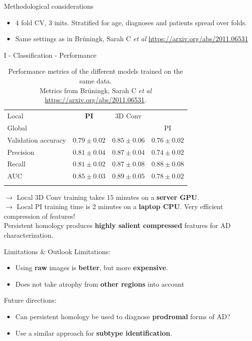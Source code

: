 \documentclass[aspectratio=169, 10pt, dvipsnames]{beamer}
\begin{document}
\begin{frame}[fragile]{Methodological considerations}
  \begin{itemize}
  \item 4 fold CV, 3 inits. Stratified for age, diagnoses and patients spread over folds.
  \item Same settings as in Br{\"u}ningk, Sarah C \textit{et al} \url{https://arxiv.org/abs/2011.06531}
  \end{itemize}
\end{frame}

\begin{frame}[fragile]{I - Classification - Performance}
\begin{table}
  \centering
  \begin{tabular}{lccc}
    \toprule
    Local & \textbf{PI} & 3D Conv & \\
    Global &&& PI\\
    \midrule
    Validation accuracy & $0.79\pm 0.02$ & $0.85\pm 0.06$ & $ 0.76\pm 0.02$ \\
    Precision & $0.81\pm 0.04$  & $0.87\pm0.04$ &  $0.74\pm 0.02$ \\
    Recall & $0.81\pm 0.02$ & $0.87\pm0.08$ & $0.88\pm 0.08$\\
    AUC & $0.85\pm 0.03$ & $0.89\pm0.05$ &  $ 0.78\pm 0.02$\\
    \bottomrule
    \vspace{1pt}
  \end{tabular}
  \caption{Performance metrics of the different models trained on the same data. \\Metrics from Br{\"u}ningk, Sarah C \textit{et al} \url{https://arxiv.org/abs/2011.06531}.}
  \label{tab:performance}
\end{table}
\pause $\rightarrow$  Local 3D Conv training takes 15 minutes on a
\textbf{server GPU}.\\
\pause $\rightarrow$ Local PI training time is 2 minutes on a \textbf{laptop CPU}. Very efficient compression of features! \\
\pause Persistent homology produces \textbf{highly salient compressed} features for AD characterization.
\end{frame}


\begin{frame}[fragile]{Limitations \& Outlook}
  Limitations:
  \begin{itemize}
    \item Using \textbf{raw} images is \textbf{better}, but more \textbf{expensive}.
    \pause \item Does not take atrophy from \textbf{other regions} into account
  \end{itemize}
  \pause Future directions:
  \begin{itemize}
     \item Can persistent homology be used to diagnose \textbf{prodromal} forms of AD?
    \pause \item Use a similar approach for \textbf{subtype identification}.
  \end{itemize}
\end{frame}
\end{document}
